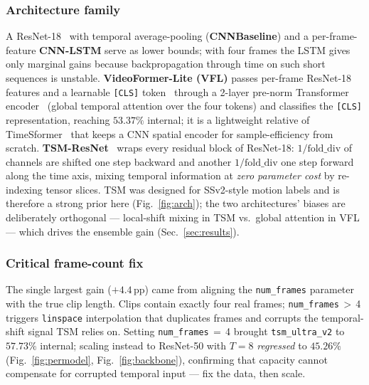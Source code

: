 \documentclass[10pt,twocolumn,letterpaper]{article}
\begin{document}
\subsubsection{Architecture family}
A ResNet-18~\cite{he2016resnet} with temporal average-pooling
(\textbf{CNNBaseline}) and a per-frame-feature \textbf{CNN-LSTM} serve as lower
bounds; with four frames the LSTM gives only marginal gains because
backpropagation through time on such short sequences is unstable.
\textbf{VideoFormer-Lite (VFL)} passes per-frame ResNet-18 features and a
learnable \texttt{[CLS]} token~\cite{dosovitskiy2021vit} through a 2-layer
pre-norm Transformer encoder~\cite{xiong2020prenorm} (global temporal attention
over the four tokens) and classifies the \texttt{[CLS]} representation,
reaching $53.37\%$ internal; it is a lightweight relative of
TimeSformer~\cite{bertasius2021timesformer} that keeps a CNN spatial encoder
for sample-efficiency from scratch.
\textbf{TSM-ResNet}~\cite{lin2019tsm} wraps every residual block of ResNet-18:
$1/\text{fold\_div}$ of channels are shifted one step backward and another
$1/\text{fold\_div}$ one step forward along the time axis, mixing temporal
information at \emph{zero parameter cost} by re-indexing tensor slices.
TSM was designed for SSv2-style motion labels and is therefore a strong prior
here (Fig.~\ref{fig:arch}); the two architectures' biases are deliberately
orthogonal --- local-shift mixing in TSM vs.\ global attention in VFL --- which
drives the ensemble gain (Sec.~\ref{sec:results}).

\subsubsection{Critical frame-count fix}
The single largest gain ($+4.4$\,pp) came from aligning the \texttt{num\_frames}
parameter with the true clip length. Clips contain exactly four real frames;
\texttt{num\_frames}\,$>$\,4 triggers \texttt{linspace} interpolation that
duplicates frames and corrupts the temporal-shift signal TSM relies on. Setting
\texttt{num\_frames}\,$=$\,4 brought \texttt{tsm\_ultra\_v2} to $57.73\%$
internal; scaling instead to ResNet-50 with $T{=}8$ \emph{regressed} to $45.26\%$
(Fig.~\ref{fig:permodel}, Fig.~\ref{fig:backbone}), confirming that capacity
cannot compensate for corrupted temporal input --- fix the data, then scale.
\end{document}
